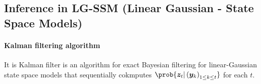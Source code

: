 \subsection{Inference in LG-SSM (Linear Gaussian - State Space Models)}
\paragraph{Kalman filtering algorithm}
It is Kalman filter is an algorithm for exact Bayesian filtering for linear-Gaussian 
state space models that sequentially cokmputes $\prob{\bm{z}_{t}|\left(\bm{y}_{k}
\right)_{1\leq k\leq t}}$ for each $t$.


